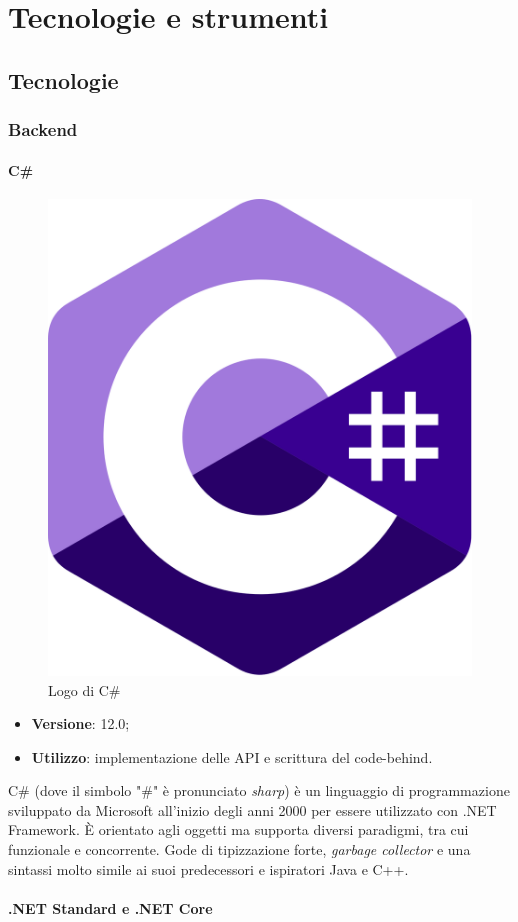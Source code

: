 \chapter{Tecnologie e strumenti}
\label{cap:tecnologie-strumenti}


\section{Tecnologie}

\subsection{Backend}

\subsubsection{C\#}

\begin{figure}[H]
    \centering 
    \includegraphics[width=0.15\columnwidth]{images/loghi/C_sharp-logo.png} 
    \caption{Logo di C\#}
\end{figure}

\begin{itemize}
    \item \textbf{Versione}: 12.0;
    \item \textbf{Utilizzo}: implementazione delle \gls{API} e scrittura del \gls{code-behind}.
\end{itemize}
C\# (dove il simbolo "\#" è pronunciato \emph{sharp}) è un linguaggio di programmazione sviluppato da Microsoft all'inizio degli anni 2000 per essere utilizzato con .NET Framework. È orientato agli oggetti ma supporta diversi paradigmi, tra cui funzionale e concorrente. Gode di tipizzazione forte, \emph{garbage collector} e una sintassi molto simile ai suoi predecessori e ispiratori Java e C++.

\subsubsection{.NET Standard e .NET Core}

